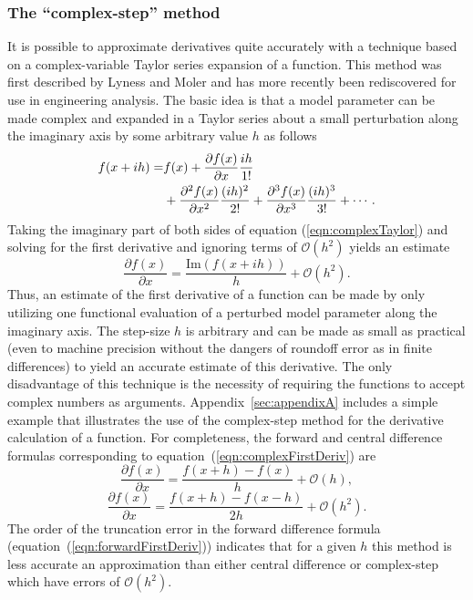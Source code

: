 \documentclass[preprint,12pt]{elsarticle}
\begin{document}
\subsubsection{The ``complex-step'' method}  
\label{sec:CSmethod} 

It is possible to approximate derivatives quite accurately with a technique based on a complex-variable Taylor series expansion of a function.  This method was first described by Lyness and Moler \cite{lyness1967numerical,lyness1968differentiation} and has more recently been rediscovered for use in engineering analysis.  The basic idea is that a model parameter can be made complex and expanded in a Taylor series about a small perturbation along the imaginary axis by some arbitrary value $h$ as follows
%
\begin{align} 
    f ( x + i h ) =& f(x) + \frac{\partial f(x)}{\partial x} \frac{i h}{1!}  \notag \\ &+ \frac{\partial^2 f(x)}{\partial x^2} \frac{(i h)^2}{2!} + \frac{\partial^3 f(x)}{\partial x^3} \frac{(i h)^3}{3!} + \cdots.
\label{eqn:complexTaylor} 
\end{align}
%
Taking the imaginary part of both sides of equation (\ref{eqn:complexTaylor}) and solving for the first derivative and ignoring terms of $\mathcal{O}\left(h^2 \right)$ yields an estimate
%
\begin{equation} \frac{\partial f( x )}{\partial x} = \frac{\mbox{Im} \left( f (x + i h) \right)}{h} +\mathcal{O}\left( h^2 \right).  
\label{eqn:complexFirstDeriv} 
\end{equation}
%
Thus, an estimate of the first derivative of a function can be made by only utilizing one functional evaluation of a perturbed model parameter along the imaginary axis.  The step-size $h$ is arbitrary and can be made as small as practical (even to machine precision without the dangers of roundoff error as in finite differences) to yield an accurate estimate of this derivative.  The only disadvantage of this technique is the necessity of requiring the functions to accept complex numbers as arguments. Appendix~\ref{sec:appendixA} includes a simple example that illustrates the use of the complex-step method for the derivative calculation of a function. 
%
For completeness, the forward and central difference formulas corresponding to equation~(\ref{eqn:complexFirstDeriv}) are \cite[Chap. 4.1.3]{chapra2010}
%
\begin{equation} 
\frac{\partial f( x )}{\partial x} = \frac{f (x + h) - f (x)}{h} +\mathcal{O}\left( h \right), 
\label{eqn:forwardFirstDeriv} 
\end{equation}
%
\begin{equation} 
\frac{\partial f( x )}{\partial x} = \frac{f (x + h) - f (x - h)}{2h} +\mathcal{O}\left( h^2 \right). 
\label{eqn:centeredFirstDeriv} 
\end{equation} 
%
The order of the truncation error in the forward difference formula (equation~(\ref{eqn:forwardFirstDeriv})) indicates that for a given $h$ this method is less accurate an approximation than either central difference or complex-step which have errors of $\mathcal{O}(h^2)$.
\end{document}
